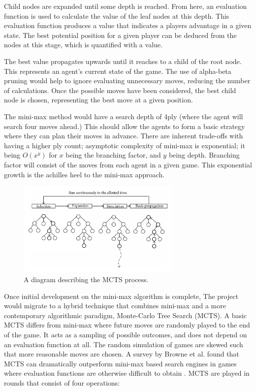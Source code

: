 \documentclass[12pt,a4paper]{article}
\begin{document}
    Child nodes are expanded until some depth is reached. From here, an evaluation function is used to calculate the value of the leaf nodes at this depth. This evaluation function produces a value that indicates a players advantage in a given state. The best potential position for a given player can be deduced from the nodes at this stage, which is quantified with a value.

    The best value propagates upwards until it reaches to a child of the root node. This represents an agent's current state of the game. The use of alpha-beta pruning would help to ignore evaluating unnecessary moves, reducing the number of calculations. Once the possible moves have been considered, the best child node is chosen, representing the best move at a given position.

    The mini-max method would have a search depth of 4ply (where the agent will search four moves ahead.) This should allow the agents to form a basic strategy where they can plan their moves in advance. There are inherent trade-offs with having a higher ply count; asymptotic complexity of mini-max is exponential; it being $O(x^y)$ for $x$ being the branching factor, and $y$ being depth. Branching factor will consist of the moves from each agent in a given game. This exponential growth is the achilles heel to the mini-max approach.

    \begin{figure}[!h]
        \centering
        \includegraphics[width=80mm]{montecarlo.png}
        \caption{A diagram describing the MCTS process.}
    \end{figure}

    Once initial development on the mini-max algorithm is complete, The project would migrate to a hybrid technique that combines mini-max and a more contemporary algorithmic paradigm, Monte-Carlo Tree Search (MCTS). A basic MCTS differs from mini-max where future moves are randomly played to the end of the game. It acts as a sampling of possible outcomes, and does not depend on an evaluation function at all. The random simulation of games are skewed such that more reasonable moves are chosen. A survey by Browne et al. found that MCTS can dramatically outperform mini-max based search engines in games where evaluation functions are otherwise difficult to obtain \cite{browne_survey_2012}. MCTS are played in rounds that consist of four operations:
\end{document}
